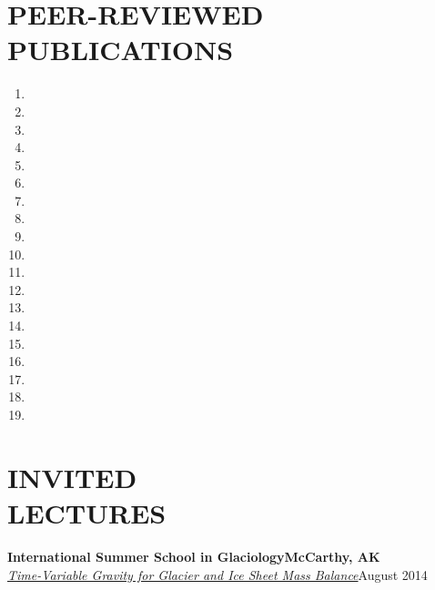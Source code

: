 \documentclass[margin,line,11pt]{res}
\begin{document}
\begin{resume}
\section{PEER-REVIEWED\\ PUBLICATIONS}
	\begin{enumerate}
		\setlength{\itemindent}{-3ex}
		\item {}
		\item {}
		\item {}
		\item {}
		\item {}
		\item {}
		\item {}
		\item {}
		\item {}
		\item {}
		\item {}
		\item {}
		\item {}
		\item {}
		\item {}
		\item {}
		\item {}
		\item {}
		\item {}
	\end{enumerate}

\section{INVITED\\ LECTURES}
	{\bf International Summer School in Glaciology}\hfill {\bf McCarthy, AK}\\
	{\em \href{http://glaciers.gi.alaska.edu/sites/default/files/Lecture_GRACE_Sutterley2014.pdf}{Time-Variable Gravity for Glacier and Ice Sheet Mass Balance}}\hfill August 2014


\end{resume}
\end{document}

